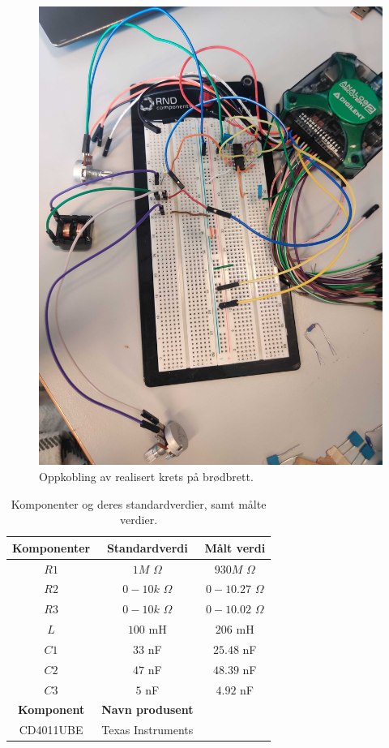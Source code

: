 \documentclass[a4paper,11pt,norsk]{article}
\begin{document}
\begin{figure}[H]
  \centering
  \includegraphics[scale=0.085]{D1/Images/oppkobling.jpg}
  \caption{Oppkobling av realisert krets på brødbrett.}
  \label{fig:oppkobling}
\end{figure}

\begin{table}[H]
  \centering
  \caption{Komponenter og deres standardverdier, samt målte verdier.}
  \label{tab:komp}
  \begin{tabular}{|c|c|c|}
    \hline\hline
    \textbf{Komponenter} & \textbf{Standardverdi} & \textbf{Målt verdi} \\
    \hline\hline
    $R1$   & $1M$ $\Omega$ & $930M$ $\Omega$\\
    \hline
    $R2$   & $0-10k$ $\Omega$ & $0-10.27$ $\Omega$\\
    \hline
    $R3$   & $0-10k$ $\Omega$ & $0-10.02$ $\Omega$\\
    \hline
    $L$   & $100$ mH       & $206$ mH\\
    \hline
    $C1$   & $33$ nF       & $25.48$ nF\\
    \hline
    $C2$   & $47$ nF       & $48.39$ nF\\
    \hline
    $C3$   & $5$ nF       & $4.92$ nF\\
    \hline\hline
    \textbf{Komponent} & \textbf{Navn produsent} &\\
    \hline
    CD4011UBE & Texas Instruments &\\
    \hline\hline
  \end{tabular}
\end{table}
\end{document}
